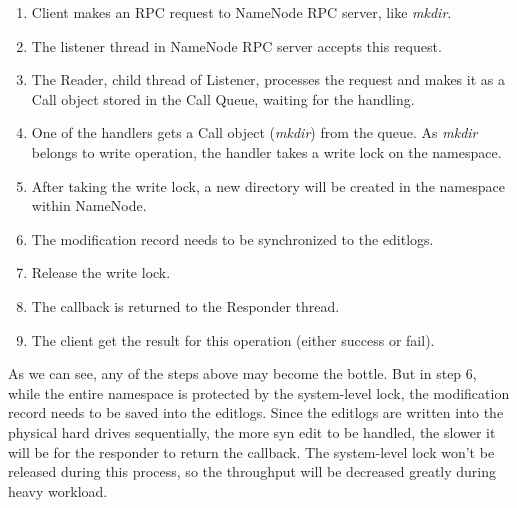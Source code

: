 \begin{enumerate}[noitemsep]
	\item Client makes an RPC request to NameNode RPC server, like \textit{mkdir}.
	\item The listener thread in NameNode RPC server accepts this request.
	\item The Reader, child thread of Listener, processes the request and makes it as a Call object stored in the Call Queue, waiting for the handling.
	\item One of the handlers gets a Call object (\textit{mkdir}) from the queue. As \textit{mkdir} belongs to write operation, the handler takes a write lock on the namespace.
	\item After taking the write lock, a new directory will be created in the namespace within NameNode.
	\item The modification record needs to be synchronized to the editlogs.
	\item Release the write lock.
	\item The callback is returned to the Responder thread.
	\item The client get the result for this operation (either success or fail).
\end{enumerate}

\noindent As we can see, any of the steps above may become the bottle. But in step 6, while the entire namespace is protected by the system-level lock, the modification record needs to be saved into the editlogs. Since the editlogs are written into the physical hard drives sequentially, the more syn edit to be handled, the slower it will be for the responder to return the callback. The system-level lock won't be released during this process, so the throughput will be decreased greatly during heavy workload.

